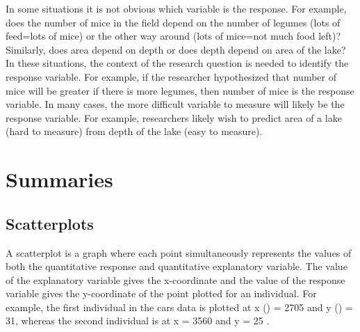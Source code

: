 \documentclass[10pt,openany]{book}\usepackage[]{graphicx}\usepackage[]{color}
\begin{document}
In some situations it is not obvious which variable is the response. For example, does the number of mice in the field depend on the number of legumes (lots of feed=lots of mice) or the other way around (lots of mice=not much food left)? Similarly, does area depend on depth or does depth depend on area of the lake? In these situations, the context of the research question is needed to identify the response variable. For example, if the researcher hypothesized that number of mice will be greater if there is more legumes, then number of mice is the response variable. In many cases, the more difficult variable to measure will likely be the response variable. For example, researchers likely wish to predict area of a lake (hard to measure) from depth of the lake (easy to measure).

\vspace{-9pt}


\vspace{-12pt}
\section{Summaries}
\vspace{-6pt}
\subsection{Scatterplots} \label{sect:ScatterplotsR}
\vspace{-3pt}
A scatterplot is a graph where each point simultaneously represents the values of both the quantitative response and quantitative explanatory variable. The value of the explanatory variable gives the x-coordinate and the value of the response variable gives the y-coordinate of the point plotted for an individual. For example, the first individual in the cars data is plotted at x () = 2705 and y () = 31, whereas the second individual is at x = 3560 and y = 25 .
\end{document}
